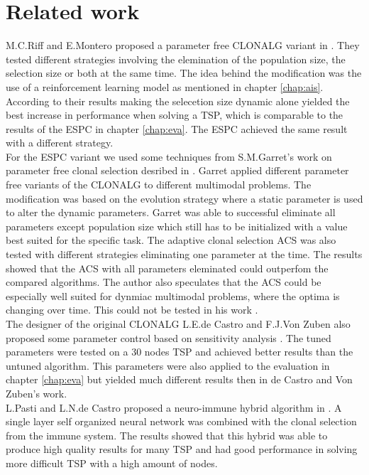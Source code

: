 \chapter{Related work}
\label{chap:rlw}
M.C.Riff and E.Montero proposed a parameter free CLONALG variant in \cite{RIFF09}. They tested different strategies involving the elemination of the population size, the selection size or both at the same time. The idea behind the modification was the use of a reinforcement learning model as mentioned in chapter \ref{chap:ais}. According to their results making the selecetion size dynamic alone yielded the best increase in performance when solving a TSP, which is comparable to the results of the ESPC in chapter \ref{chap:eva}. The ESPC achieved the same result with a different strategy.\\
For the ESPC variant we used some techniques from S.M.Garret's work on parameter free clonal selection desribed in \cite{Garret04}. Garret applied different parameter free variants of the CLONALG to different multimodal problems. The modification was based on the evolution strategy where a static parameter is used to alter the dynamic parameters. Garret was able to successful eliminate all parameters except population size which still has to be initialized with a value best suited for the specific task. The adaptive clonal selection ACS was also tested with different strategies eliminating one parameter at the time. The results showed that the ACS with all parameters eleminated could outperfom the compared algorithms. The author also speculates that the ACS could be especially well suited for dynmiac multimodal problems, where the optima is changing over time. This could not be tested in his work \cite{Garret04}.\\
The designer of the original CLONALG L.E.de Castro and F.J.Von Zuben also proposed some parameter control based on sensitivity analysis \cite{DEC02}. The tuned parameters were tested on a 30 nodes TSP and achieved better results than the untuned algorithm. This parameters were also applied to the evaluation in chapter \ref{chap:eva} but yielded much different results then in de Castro and Von Zuben's work.\\
L.Pasti and L.N.de Castro proposed a neuro-immune hybrid algorithm in \cite{Pasti06}. A single layer self organized neural network was combined with the clonal selection from the immune system. The results showed that this hybrid was able to produce high quality results for many TSP and had good performance in solving more difficult TSP with a high amount of nodes. 